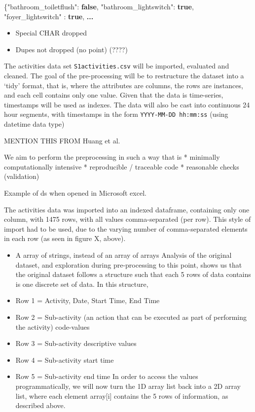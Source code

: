 \documentclass[11pt]{article}
\providecommand{\tightlist}{%
      \setlength{\itemsep}{0pt}\setlength{\parskip}{0pt}}
\newenvironment{Shaded}{}{}
\newcommand{\KeywordTok}[1]{\textcolor[rgb]{0.00,0.44,0.13}{\textbf{{#1}}}}
\newcommand{\DataTypeTok}[1]{\textcolor[rgb]{0.56,0.13,0.00}{{#1}}}
\newcommand{\FunctionTok}[1]{\textcolor[rgb]{0.02,0.16,0.49}{{#1}}}
\newcommand{\ErrorTok}[1]{\textcolor[rgb]{1.00,0.00,0.00}{\textbf{{#1}}}}
\begin{document}
    \begin{Shaded}
\begin{Highlighting}[]
\FunctionTok{\{}\DataTypeTok{"bathroom_toiletflush"}\FunctionTok{:} \KeywordTok{false}\FunctionTok{,} 
 \DataTypeTok{"bathroom_lightswitch"}\FunctionTok{:} \KeywordTok{true}\FunctionTok{,} 
 \DataTypeTok{"foyer_lightswitch"}   \FunctionTok{:} \KeywordTok{true}\FunctionTok{,} \ErrorTok{...}
\end{Highlighting}
\end{Shaded}

    \begin{itemize}
\tightlist
\item
  Special CHAR dropped
\item
  Dupes not dropped (no point) (????) 
\end{itemize}


    The activities data set \texttt{S1activities.csv} will be imported,
evaluated and cleaned. The goal of the pre-processing will be to
restructure the dataset into a `tidy' format, that is, where the
attributes are columns, the rows are instances, and each cell contains
only one value. Given that the data is time-series, timestamps will be
used as indexes. The data will also be cast into continuous 24 hour
segments, with timestamps in the form \texttt{YYYY-MM-DD\ hh:mm:ss}
(using datetime data type)

MENTION THIS FROM Huang et al.~

We aim to perform the preprocessing in such a way that is * minimally
computationally intensive * reproducible / traceable code * reasonable
checks (validation)

Example of ds when opened in Microsoft excel.

The activities data was imported into an indexed dataframe, containing
only one column, with 1475 rows, with all values comma-separated (per
row). This style of import had to be used, due to the varying number of
comma-separated elements in each row (as seen in figure X, above).

\begin{itemize}
\tightlist
\item
  A array of strings, instead of an array of arrays Analysis of the
  original dataset, and exploration during pre-processing to this point,
  shows us that the original dataset follows a structure such that each
  5 rows of data contains is one discrete set of data. In this
  structure,
\item
  Row 1 = Activity, Date, Start Time, End Time
\item
  Row 2 = Sub-activity (an action that can be executed as part of
  performing the activity) code-values
\item
  Row 3 = Sub-activity descriptive values
\item
  Row 4 = Sub-activity start time
\item
  Row 5 = Sub-activity end time In order to access the values
  programmatically, we will now turn the 1D array list back into a 2D
  array list, where each element array{[}i{]} contains the 5 rows of
  information, as described above.
\end{itemize}
\end{document}
